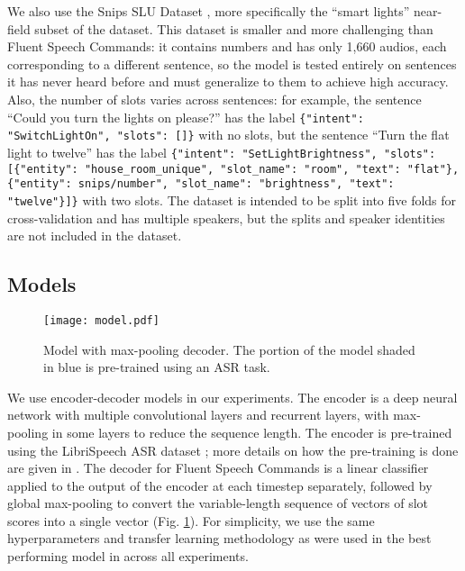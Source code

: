 \documentclass{article}
\begin{document}
We also use the Snips SLU Dataset \cite{saade2018spoken}, more specifically the ``smart lights'' near-field subset of the dataset. This dataset is smaller and more challenging than Fluent Speech Commands: it contains numbers and has only 1,660 audios, each corresponding to a different sentence,  so the model is tested entirely on sentences it has never heard before and must generalize to them to achieve high accuracy. Also, the number of slots varies across sentences: for example, the sentence ``Could you turn the lights on please?'' has the label \texttt{\{"intent": "SwitchLightOn", "slots": []\}} with no slots, but the sentence ``Turn the flat light to twelve'' has the label \texttt{\{"intent": "SetLightBrightness", "slots": [\{"entity": "house\_room\_unique", "slot\_name": "room", "text": "flat"\}, \{"entity": snips/number", "slot\_name": "brightness", "text": "twelve"\}]\}} with two slots. 
The dataset is intended to be split into five folds for cross-validation and has multiple speakers, but the splits and speaker identities are not included in the dataset.

\subsection{Models}

\begin{figure}[t]
    \centering
    \texttt{[image: model.pdf]}
    \caption{Model with max-pooling decoder. The portion of the model shaded in blue is pre-trained using an ASR task.}
    \label{fig:max-pooling-decoder}
\end{figure}

We use encoder-decoder models in our experiments. The encoder is a deep neural network with multiple convolutional layers and recurrent layers, with max-pooling in some layers to reduce the sequence length. The encoder is pre-trained using the LibriSpeech ASR dataset \cite{librispeech}; more details on how the pre-training is done are given in \cite{Lugosch2019}. The decoder for Fluent Speech Commands is a linear classifier applied to the output of the encoder at each timestep separately, followed by global max-pooling to convert the variable-length sequence of vectors of slot scores into a single vector (Fig. \ref{fig:max-pooling-decoder}). For simplicity, we use the same hyperparameters and transfer learning methodology as were used in the best performing model in \cite{Lugosch2019} across all experiments.
\end{document}
